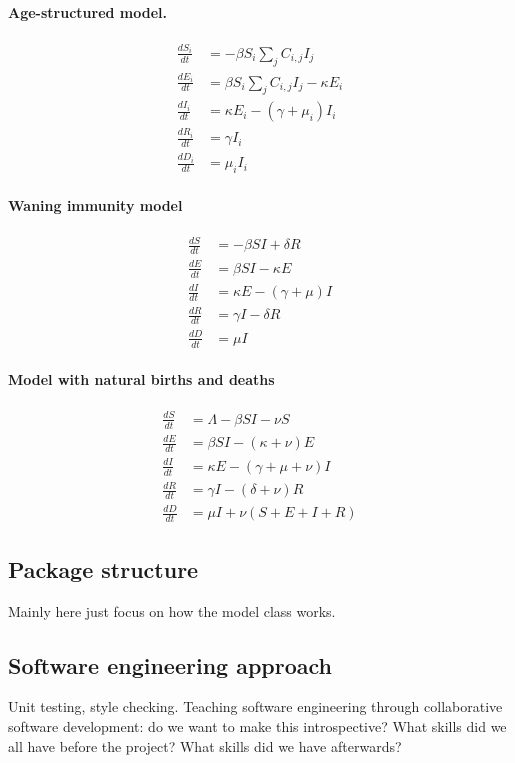 \documentclass[]{article}
\begin{document}
\paragraph{Age-structured model.}

\begin{align}
\frac{dS_i}{dt} &= - \beta S_i \sum_{j} C_{i,j} I_j\\
\frac{dE_i}{dt} &= \beta S_i \sum_{j} C_{i,j} I_j - \kappa E_i\\
\frac{dI_i}{dt} &= \kappa E_i - (\gamma + \mu_i) I_i\\
\frac{dR_i}{dt} &= \gamma I_i\\
\frac{dD_i}{dt} &= \mu_i I_i
\end{align}

\paragraph{Waning immunity model}
\begin{align}
\frac{dS}{dt} &= - \beta S I + \delta R\\
\frac{dE}{dt} &= \beta S I - \kappa E\\
\frac{dI}{dt} &= \kappa E - (\gamma + \mu) I\\
\frac{dR}{dt} &= \gamma I - \delta R\\
\frac{dD}{dt} &= \mu I
\end{align}

\paragraph{Model with natural births and deaths}
\begin{align}
\frac{dS}{dt} &= \Lambda - \beta S I - \nu S\\
\frac{dE}{dt} &= \beta S I - (\kappa + \nu) E\\
\frac{dI}{dt} &= \kappa E - (\gamma + \mu + \nu) I\\
\frac{dR}{dt} &= \gamma I - (\delta + \nu) R\\
\frac{dD}{dt} &= \mu I + \nu (S + E + I + R)
\end{align}

\subsection{Package structure}
Mainly here just focus on how the model class works.

\subsection{Software engineering approach}
Unit testing, style checking.
Teaching software engineering through collaborative software development: do we want to make this introspective? What skills did we all have before the project? What skills did we have afterwards?
\end{document}
